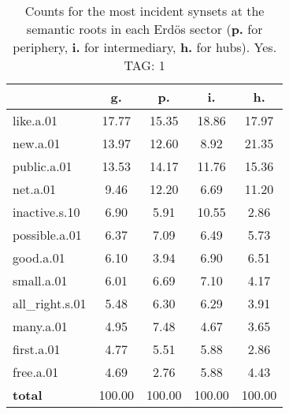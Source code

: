\begin{table}[h!]
\begin{center}
\begin{tabular}{| l | c | c | c | c |}\hline
 & g. & p. & i. & h. \\\hline
like.a.01 & 17.77  & 15.35  & 18.86  & 17.97 \\\hline
new.a.01 & 13.97  & 12.60  & 8.92  & 21.35 \\\hline
public.a.01 & 13.53  & 14.17  & 11.76  & 15.36 \\\hline
net.a.01 & 9.46  & 12.20  & 6.69  & 11.20 \\\hline
inactive.s.10 & 6.90  & 5.91  & 10.55  & 2.86 \\\hline
possible.a.01 & 6.37  & 7.09  & 6.49  & 5.73 \\\hline
good.a.01 & 6.10  & 3.94  & 6.90  & 6.51 \\\hline
small.a.01 & 6.01  & 6.69  & 7.10  & 4.17 \\\hline
all\_right.s.01 & 5.48  & 6.30  & 6.29  & 3.91 \\\hline
many.a.01 & 4.95  & 7.48  & 4.67  & 3.65 \\\hline
first.a.01 & 4.77  & 5.51  & 5.88  & 2.86 \\\hline
free.a.01 & 4.69  & 2.76  & 5.88  & 4.43 \\\hline
{{\bf total}} & 100.00  & 100.00  & 100.00  & 100.00 \\\hline
\end{tabular}
\caption{Counts for the most incident synsets at the semantic roots in each Erd\"os sector ({\bf p.} for periphery, {\bf i.} for intermediary, {\bf h.} for hubs). Yes. TAG: 1}
\end{center}
\end{table}